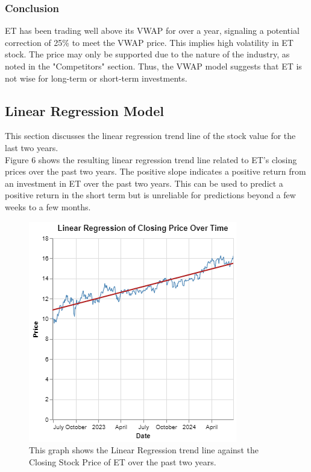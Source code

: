 \documentclass[9pt,a4paper,twoside]{tau}
\begin{document}
        \subsubsection{Conclusion}
        
            ET has been trading well above its VWAP for over a year, signaling a potential correction of 25\% to meet the VWAP price. This implies high volatility in ET stock. The price may only be supported due to the nature of the industry, as noted in the "Competitors" section. Thus, the VWAP model suggests that ET is not wise for long-term or short-term investments.

    \subsection{Linear Regression Model}
    
        This section discusses the linear regression trend line of the stock value for the last two years.\\

        Figure 6 shows the resulting linear regression trend line related to ET's closing prices over the past two years. The positive slope indicates a positive return from an investment in ET over the past two years. This can be used to predict a positive return in the short term but is unreliable for predictions beyond a few weeks to a few months.

    
        \begin{figure}[H]
            \centering
            \includegraphics[height=.50\columnwidth]{Figures/LinearRegression.png}
            \caption{This graph shows the Linear Regression trend line against the Closing Stock Price of ET over the past two years\cite{yahoo-finance-2024}.}
            \label{fig:figure}
        \end{figure}  
        
\end{document}
